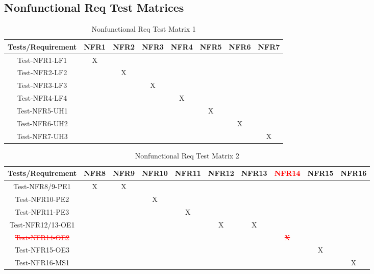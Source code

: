 \documentclass[12pt, titlepage]{article}
\begin{document}
\subsection{Nonfunctional Req Test Matrices}
\begin{table}[htp]
\centering
\caption{Nonfunctional Req Test Matrix 1}
\begin{tabular}{|c|c|c|c|c|c|c|c|}
\hline
Tests/Requirement & NFR1 & NFR2 & NFR3 & NFR4 & NFR5 & NFR6 & NFR7 \\
\hline
Test-NFR1-LF1     & X    &      &      &      &      &      &      \\
\hline
Test-NFR2-LF2     &      & X    &      &      &      &      &      \\
\hline
Test-NFR3-LF3     &      &      & X    &      &      &      &      \\
\hline
Test-NFR4-LF4     &      &      &      & X    &      &      &      \\
\hline
Test-NFR5-UH1     &      &      &      &      & X    &      &      \\
\hline
Test-NFR6-UH2     &      &      &      &      &      & X    &      \\
\hline
Test-NFR7-UH3     &      &      &      &      &      &      & X\\
\hline   
\end{tabular}
\end{table}
\begin{table}[htp]
\centering
\caption{Nonfunctional Req Test Matrix 2}
\begin{tabular}{|c|c|c|c|c|c|c|c|c|c|}
\hline
Tests/Requirement & NFR8 & NFR9 & NFR10 & NFR11 & NFR12 & NFR13 & \textcolor{red}{\st{NFR14}} & NFR15 & NFR16 \\
\hline
Test-NFR8/9-PE1   & X    & X    &       &       &       &       &       &       &       \\
\hline
Test-NFR10-PE2    &      &      & X     &       &       &       &       &       &       \\
\hline
Test-NFR11-PE3    &      &      &       & X     &       &       &       &       &       \\
\hline
Test-NFR12/13-OE1 &      &      &       &       & X     & X     &       &       &       \\
\hline
\textcolor{red}{\st{Test-NFR14-OE2}}    &      &      &       &       &       &       & \textcolor{red}{\st{X}}     &       &       \\
\hline
Test-NFR15-OE3    &      &      &       &       &       &       &       & X     &       \\
\hline
Test-NFR16-MS1    &      &      &       &       &       &       &       &       & X    \\ \hline
\end{tabular}
\end{table}
\end{document}
